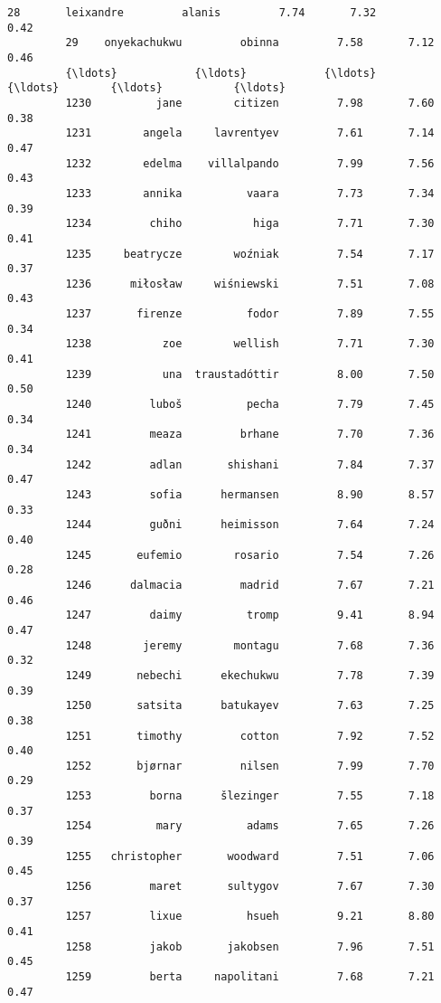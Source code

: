 \documentclass[11pt]{article}
\begin{document}
\begin{Verbatim}[commandchars=\\\{\}]
         28       leixandre         alanis         7.74       7.32          0.42   
         29    onyekachukwu         obinna         7.58       7.12          0.46   
         {\ldots}            {\ldots}            {\ldots}          {\ldots}        {\ldots}           {\ldots}   
         1230          jane        citizen         7.98       7.60          0.38   
         1231        angela     lavrentyev         7.61       7.14          0.47   
         1232        edelma    villalpando         7.99       7.56          0.43   
         1233        annika          vaara         7.73       7.34          0.39   
         1234         chiho           higa         7.71       7.30          0.41   
         1235     beatrycze        woźniak         7.54       7.17          0.37   
         1236      miłosław     wiśniewski         7.51       7.08          0.43   
         1237       firenze          fodor         7.89       7.55          0.34   
         1238           zoe        wellish         7.71       7.30          0.41   
         1239           una  traustadóttir         8.00       7.50          0.50   
         1240         luboš          pecha         7.79       7.45          0.34   
         1241         meaza         brhane         7.70       7.36          0.34   
         1242         adlan       shishani         7.84       7.37          0.47   
         1243         sofia      hermansen         8.90       8.57          0.33   
         1244         guðni      heimisson         7.64       7.24          0.40   
         1245       eufemio        rosario         7.54       7.26          0.28   
         1246      dalmacia         madrid         7.67       7.21          0.46   
         1247         daimy          tromp         9.41       8.94          0.47   
         1248        jeremy        montagu         7.68       7.36          0.32   
         1249       nebechi      ekechukwu         7.78       7.39          0.39   
         1250       satsita      batukayev         7.63       7.25          0.38   
         1251       timothy         cotton         7.92       7.52          0.40   
         1252       bjørnar         nilsen         7.99       7.70          0.29   
         1253         borna      šlezinger         7.55       7.18          0.37   
         1254          mary          adams         7.65       7.26          0.39   
         1255   christopher       woodward         7.51       7.06          0.45   
         1256         maret       sultygov         7.67       7.30          0.37   
         1257         lixue          hsueh         9.21       8.80          0.41   
         1258         jakob       jakobsen         7.96       7.51          0.45   
         1259         berta     napolitani         7.68       7.21          0.47   
         

\end{Verbatim}
\end{document}
